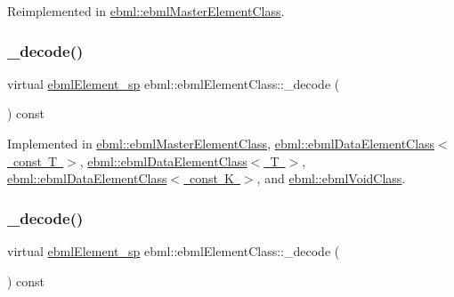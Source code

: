 Reimplemented in \mbox{\hyperlink{classebml_1_1ebmlMasterElementClass_a6ef689ac153338400cfb8367edd32f54}{ebml\+::ebml\+Master\+Element\+Class}}.

\mbox{\label{classebml_1_1ebmlElementClass_aa6bf675de4918fd7b553d141871a2ede}} 
\subsubsection{\texorpdfstring{\+\_\+decode()}{\_decode()}\hspace{0.1cm}{\footnotesize\ttfamily [1/2]}}
{\footnotesize\ttfamily virtual \mbox{\hyperlink{namespaceebml_adad533b7705a16bb360fe56380c5e7be}{ebml\+Element\+\_\+sp}} ebml\+::ebml\+Element\+Class\+::\+\_\+decode (\begin{DoxyParamCaption}\item[{const \mbox{\hyperlink{classebml_1_1parseString}{parse\+String}} \&}]{ }\end{DoxyParamCaption}) const\hspace{0.3cm}{\ttfamily [pure virtual]}}



Implemented in \mbox{\hyperlink{classebml_1_1ebmlMasterElementClass_a4499f7187f0480518080cf8135884981}{ebml\+::ebml\+Master\+Element\+Class}}, \mbox{\hyperlink{classebml_1_1ebmlDataElementClass_3_01const_01T_01_4_a0f8a6e30cd3cc630950a780a726849a7}{ebml\+::ebml\+Data\+Element\+Class$<$ const T $>$}}, \mbox{\hyperlink{classebml_1_1ebmlDataElementClass_a481cda6ab9f96ab21434daabd9ad1ed9}{ebml\+::ebml\+Data\+Element\+Class$<$ T $>$}}, \mbox{\hyperlink{classebml_1_1ebmlDataElementClass_a481cda6ab9f96ab21434daabd9ad1ed9}{ebml\+::ebml\+Data\+Element\+Class$<$ const K $>$}}, and \mbox{\hyperlink{classebml_1_1ebmlVoidClass_ab12dc43d26e82dee3c66d69219e4d78d}{ebml\+::ebml\+Void\+Class}}.

\mbox{\label{classebml_1_1ebmlElementClass_aedbfff5909af215acaa3ca28643f1bc9}} 
\subsubsection{\texorpdfstring{\+\_\+decode()}{\_decode()}\hspace{0.1cm}{\footnotesize\ttfamily [2/2]}}
{\footnotesize\ttfamily virtual \mbox{\hyperlink{namespaceebml_adad533b7705a16bb360fe56380c5e7be}{ebml\+Element\+\_\+sp}} ebml\+::ebml\+Element\+Class\+::\+\_\+decode (\begin{DoxyParamCaption}\item[{const \mbox{\hyperlink{classebml_1_1parseFile}{parse\+File}} \&}]{ }\end{DoxyParamCaption}) const\hspace{0.3cm}{\ttfamily [pure virtual]}}



